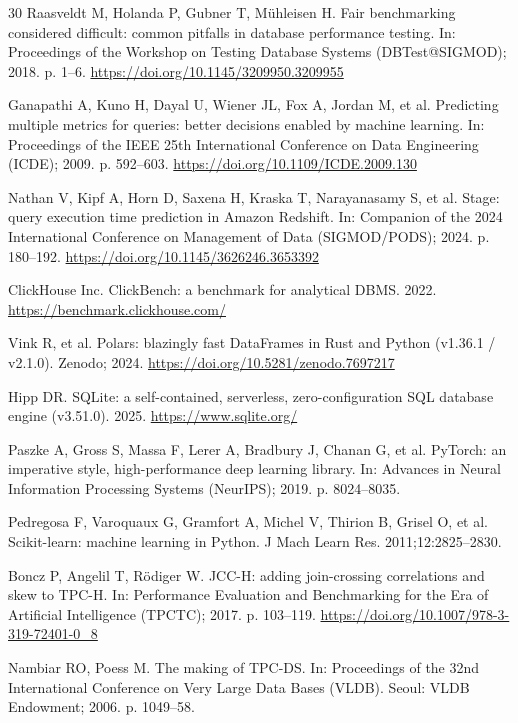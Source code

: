 \documentclass[10pt,a4paper]{article}
\begin{document}
{\begin{thebibliography}{30}
Raasveldt M, Holanda P, Gubner T, M{\"u}hleisen H. Fair benchmarking considered difficult: common pitfalls in database performance testing. In: Proceedings of the Workshop on Testing Database Systems (DBTest@SIGMOD); 2018. p. 1--6. \url{https://doi.org/10.1145/3209950.3209955}

Ganapathi A, Kuno H, Dayal U, Wiener JL, Fox A, Jordan M, et al. Predicting multiple metrics for queries: better decisions enabled by machine learning. In: Proceedings of the IEEE 25th International Conference on Data Engineering (ICDE); 2009. p. 592--603. \url{https://doi.org/10.1109/ICDE.2009.130}

Nathan V, Kipf A, Horn D, Saxena H, Kraska T, Narayanasamy S, et al. Stage: query execution time prediction in Amazon Redshift. In: Companion of the 2024 International Conference on Management of Data (SIGMOD/PODS); 2024. p. 180--192. \url{https://doi.org/10.1145/3626246.3653392}

ClickHouse Inc. ClickBench: a benchmark for analytical DBMS. 2022. \url{https://benchmark.clickhouse.com/}

Vink R, et al. Polars: blazingly fast DataFrames in Rust and Python (v1.36.1 / v2.1.0). Zenodo; 2024. \url{https://doi.org/10.5281/zenodo.7697217}

Hipp DR. SQLite: a self-contained, serverless, zero-configuration SQL database engine (v3.51.0). 2025. \url{https://www.sqlite.org/}

Paszke A, Gross S, Massa F, Lerer A, Bradbury J, Chanan G, et al. PyTorch: an imperative style, high-performance deep learning library. In: Advances in Neural Information Processing Systems (NeurIPS); 2019. p. 8024--8035.

Pedregosa F, Varoquaux G, Gramfort A, Michel V, Thirion B, Grisel O, et al. Scikit-learn: machine learning in Python. J Mach Learn Res. 2011;12:2825--2830.

Boncz P, Angelil T, R{\"o}diger W. JCC-H: adding join-crossing correlations and skew to TPC-H. In: Performance Evaluation and Benchmarking for the Era of Artificial Intelligence (TPCTC); 2017. p. 103--119. \url{https://doi.org/10.1007/978-3-319-72401-0_8}

Nambiar RO, Poess M. The making of TPC-DS. In: Proceedings of the 32nd International Conference on Very Large Data Bases (VLDB). Seoul: VLDB Endowment; 2006. p. 1049--58.


\end{thebibliography}}
\end{document}
